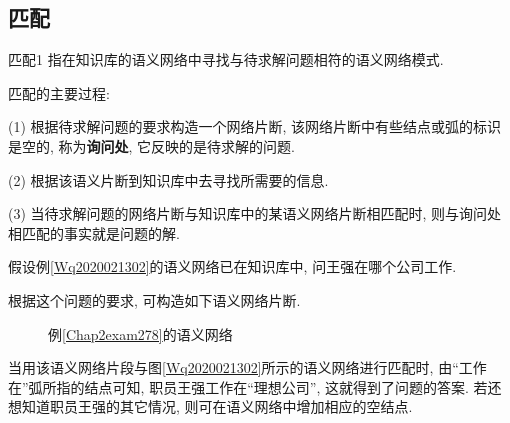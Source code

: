 \subsection{匹配}
\begin{mydef}{匹配}{1}
    指在知识库的语义网络中寻找与待求解问题相符的语义网络模式.
\end{mydef}匹配的主要过程:

    (1) 根据待求解问题的要求构造一个网络片断, 该网络片断中有些结点或弧的标识是空的, 称为\textbf{询问处}, 它反映的是待求解的问题.

    (2) 根据该语义片断到知识库中去寻找所需要的信息.

    (3) 当待求解问题的网络片断与知识库中的某语义网络片断相匹配时, 则与询问处相匹配的事实就是问题的解.
\begin{example}\label{Chap2exam278}
    假设例\ref{Wq2020021302}的语义网络已在知识库中, 问王强在哪个公司工作.
\end{example}

根据这个问题的要求, 可构造如下语义网络片断.
\begin{figure}[H]
\begin{center}
\caption{例\ref{Chap2exam278}的语义网络}
\label{AI32fig105}
\end{center}
\end{figure}
当用该语义网络片段与图\ref{Wq2020021302}所示的语义网络进行匹配时, 由“工作在”弧所指的结点可知, 职员王强工作在“理想公司”, 这就得到了问题的答案.
若还想知道职员王强的其它情况, 则可在语义网络中增加相应的空结点.
